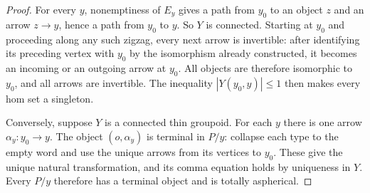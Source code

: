 \documentclass[11pt,a4paper]{article}
\theoremstyle{definition}
\theoremstyle{remark}
\begin{document}
\begin{proof}
For every $y$, nonemptiness of $E_y$ gives a path from $y_0$ to an
object $z$ and an arrow $z\to y$, hence a path from $y_0$ to $y$.
So $Y$ is connected.  Starting at $y_0$ and proceeding along any such
zigzag, every next arrow is invertible: after identifying its preceding
vertex with $y_0$ by the isomorphism already constructed, it becomes an
incoming or an outgoing arrow at $y_0$.  All objects are therefore
isomorphic to $y_0$, and all arrows are invertible.  The inequality
$|Y(y_0,y)|\leq1$ then makes every hom set a singleton.

Conversely, suppose $Y$ is a connected thin groupoid.  For each $y$
there is one arrow $\alpha_y:y_0\to y$.  The object $(o,\alpha_y)$ is
terminal in $P/y$: collapse each type to the empty word and use the
unique arrows from its vertices to $y_0$.  These give the unique natural
transformation, and its comma equation holds by uniqueness in $Y$.
Every $P/y$ therefore has a terminal object and is totally aspherical.
\end{proof}
\end{document}
